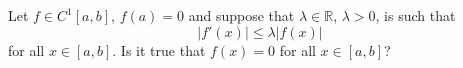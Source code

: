 Let $f\in C^1[a,b]$, $f(a)=0$ and suppose that $\lambda\in\mathbb R$, $\lambda >0$, is such that
$$|f'(x)|\leq \lambda |f(x)|$$for all $x\in [a,b]$. Is it true that $f(x)=0$ for all $x\in [a,b]$?
